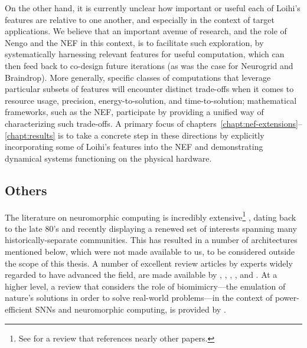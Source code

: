 On the other hand, it is currently unclear how important or useful each of Loihi's features are relative to one another, and especially in the context of target applications.
We believe that an important avenue of research, and the role of Nengo and the NEF in this context, is to facilitate such exploration, by systematically harnessing relevant features for useful computation, which can then feed back to co-design future iterations (as was the case for Neurogrid and Braindrop).
More generally, specific classes of computations that leverage particular subsets of features will encounter distinct trade-offs when it comes to resource usage, precision, energy-to-solution, and time-to-solution; mathematical frameworks, such as the NEF, participate by providing a unified way of characterizing such trade-offs.
A primary focus of chapters~\ref{chapt:nef-extensions}--\ref{chapt:results} is to take a concrete step in these directions by explicitly incorporating some of Loihi's features into the NEF and demonstrating dynamical systems functioning on the physical hardware.

\subsection{Others}
\label{sec:neuromorphic-others}

The literature on neuromorphic computing is incredibly extensive\footnote{%
See \citet{schuman2017survey} for a review that references nearly  other papers.}%
, dating back to the late 80's and recently displaying a renewed set of interests spanning many historically-separate communities.
This has resulted in a number of architectures mentioned below, which were not made available to us, to be considered outside the scope of this thesis.
A number of excellent review articles by experts widely regarded to have advanced the field, are made available by \citet{bartolozzi1999neuromorphic}, \citet{indiveri2011neuromorphic}, \citet{cassidy2013design}, \citet{cummings2018}, and \citet{rajendran2019low}.
At a higher level, a review that considers the role of biomimicry---the emulation of nature's solutions in order to solve real-world problems---in the context of power-efficient SNNs and neuromorphic computing, is provided by \citet{krichmar2018making}.

